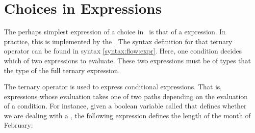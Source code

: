\section{Choices in Expressions}

The perhaps simplest expression of a choice in \csharp\ is that of a  expression. In practice, this is implemented by the . The syntax definition for that ternary operator can be found in syntax \ref{syntax:flow:expr}. Here, one condition decides which of two expressions to evaluate. These two expressions must be of types that  the type of the full ternary expression.

\begin{syntaxfloat}
  
  \caption{Ternary operators in expressions}
  \label{syntax:flow:expr}
\end{syntaxfloat}

The ternary operator is used to express conditional expressions. That is, expressions whose evaluation takes one of two paths depending on the evaluation of a condition. For instance, given a boolean variable called  that defines whether we are dealing with a , the following expression defines the length of the month of February:

\inputminted[firstline=2, lastline=2]{csharp}{../src/csharp/flow_expr/leapyear/Program.cs}
